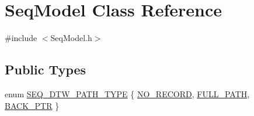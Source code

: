 \hypertarget{class_seq_model}{\section{Seq\+Model Class Reference}
\label{class_seq_model}
}


{\ttfamily \#include $<$Seq\+Model.\+h$>$}

\subsection*{Public Types}
\begin{DoxyCompactItemize}
\item 
enum \hyperlink{class_seq_model_a145b769692f03811a15c5289fe77da42}{S\+E\+Q\+\_\+\+D\+T\+W\+\_\+\+P\+A\+T\+H\+\_\+\+T\+Y\+P\+E} \{ \hyperlink{class_seq_model_a145b769692f03811a15c5289fe77da42ae15b7c3ac3eac793a9b988649f728d12}{N\+O\+\_\+\+R\+E\+C\+O\+R\+D}, 
\hyperlink{class_seq_model_a145b769692f03811a15c5289fe77da42a0ed418410acf105f3baf2ccbfbc4a5c4}{F\+U\+L\+L\+\_\+\+P\+A\+T\+H}, 
\hyperlink{class_seq_model_a145b769692f03811a15c5289fe77da42a4e15f646c0c498e155c24f183dbfb6fb}{B\+A\+C\+K\+\_\+\+P\+T\+R}
 \}
\end{DoxyCompactItemize}
